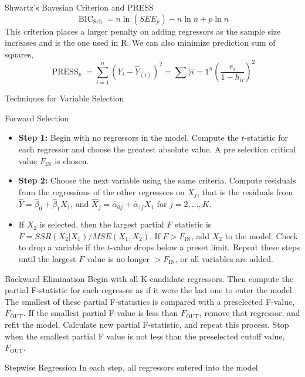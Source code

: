 \documentclass{article}
\DeclareMathOperator{\bic}{BIC}
\DeclareMathOperator{\sch}{Sch}
\DeclareMathOperator{\press}{PRESS}
\DeclareMathOperator{\fin}{IN}
\DeclareMathOperator{\fout}{OUT}
\begin{document}
\begin{multicols*}{3}
\begin{blackbox}{Shwartz's Bayesian Criterion and PRESS}
            \[\bic_{\sch} = n\ln (SEE_p) - n \ln n + p \ln n\]
            This criterion places a larger penalty on adding regressors as the sample size increases and is the one used in R. We can also minimize prediction sum of squares,
            \[\press_p = \sum_{i=1}^n(Y_i - \hat{Y}_{(i)})^2 = \sum){i=1}^n\left(\frac{e_i}{1-h_{ii}}\right)^2\]
        \end{blackbox}
        \begin{blackbox}{Techniques for Variable Selection}
            \begin{redbox}{Forward Selection}
                \begin{itemize}[leftmargin=7pt]
                    \item \textbf{Step 1:} Begin with no regressors in the model. Compute the $t$-statistic for each regressor and choose the greatest absolute value. A pre selection critical value $F_{\fin}$ is chosen. 
                    \item \textbf{Step 2:} Choose the next variable using the same criteria. Compute residuals from the regressions of the other regressors on $X_j$, that is the residuals from $\hat{Y} = \hat{\beta}_0 + \hat{\beta}_1X_1$, and $\hat{X}_j = \hat{\alpha}_{0j} + \hat{\alpha}_{1j}X_1$ for $j = 2, \ldots, K$.
                    \item If $X_2$ is selected, then the largest partial $F$ statistic is $F = SSR(X_2|X_1)/MSE(X_1,X_2)$. If $F > F_{\fin}$, add $X_2$ to the model. Check to drop a variable if the $t$-value drops below a preset limit. Repeat these steps until the largest $F$ value is no longer $> F_{\fin}$, or all variables are added.
                \end{itemize}
            \end{redbox}
            \begin{brownbox}{Backward Elimination}
                Begin with all K candidate regressors. Then compute the partial F-statistic for each regressor as if it were the last one to enter the model. The smallest of these partial F-statistics is compared with a preselected F-value, $F_{\fout}$. If the smallest partial F-value is less than $F_{\fout}$, remove that regressor, and refit the model. Calculate new partial F-statistic, and repeat this process. Stop when the smallest partial F value is not less than the preselected cutoff value, $F_{\fout}$. 
            \end{brownbox}
            \begin{pinkbox}{Stepwise Regression}
                In each step, all regressors entered into the model

\end{pinkbox}
\end{blackbox}
\end{multicols*}
\end{document}
